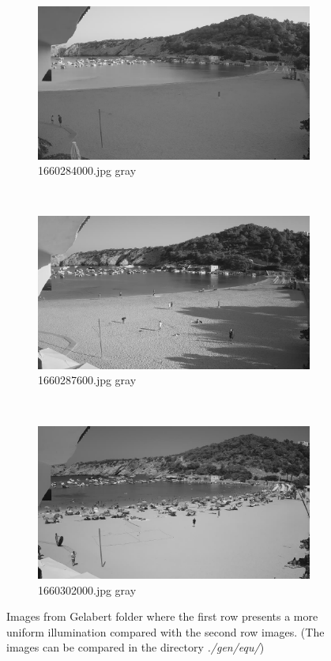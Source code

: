 \documentclass[10pt]{article}
\begin{document}
\begin{figure}[h]
  \medskip
  \begin{subfigure}{0.25\textwidth}
    \includegraphics[width=\linewidth]{../gen/gray/1660284000.jpg}
    \caption{1660284000.jpg gray}
    \label{fig:4}
  \end{subfigure}\hfil %
  ~
  \begin{subfigure}{0.25\textwidth}
    \includegraphics[width=\linewidth]{../gen/gray/1660287600.jpg}
    \caption{1660287600.jpg gray}
    \label{fig:4}
  \end{subfigure}\hfil %
  ~
  \begin{subfigure}{0.25\textwidth}
    \includegraphics[width=\linewidth]{../gen/gray/1660302000.jpg}
    \caption{1660302000.jpg gray}
    \label{fig:4}
  \end{subfigure}\hfil %
  \caption{Images from Gelabert folder where the first row presents a more uniform illumination compared with the second row images. (The images can be compared in the directory \textit{./gen/equ/})}
\end{figure}
\end{document}
